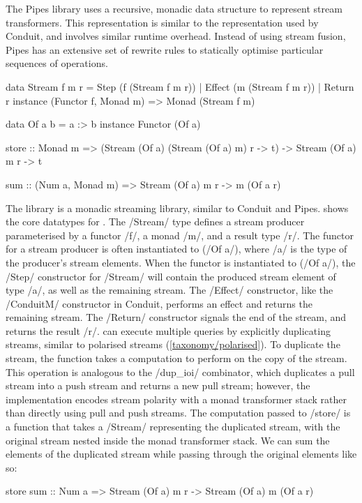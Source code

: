 The Pipes library uses a recursive, monadic data structure to represent stream transformers.
This representation is similar to the representation used by Conduit, and involves similar runtime overhead.
Instead of using stream fusion, Pipes has an extensive set of rewrite rules to statically optimise particular sequences of operations.


\begin{haskell}[float,caption=\Streaming library datatypes,label=l:bench:def:streaming]
data Stream f m r =
    Step   (f (Stream f m r))
  | Effect (m (Stream f m r))
  | Return r
instance (Functor f, Monad m) => Monad (Stream f m)

data Of a b = a :> b
instance Functor (Of a)

store :: Monad m =>
      (Stream (Of a) (Stream (Of a) m) r -> t) ->
      Stream (Of a) m r -> t

sum  :: (Num a, Monad m) =>
      Stream (Of a) m r -> m (Of a r)
\end{haskell}

The \Streaming library is a monadic streaming library, similar to Conduit and Pipes.
 shows the core datatypes for \Streaming.
The \Hs/Stream/ type defines a stream producer parameterised by a functor \Hs/f/, a monad \Hs/m/, and a result type \Hs/r/.
The functor for a stream producer is often instantiated to (\Hs/Of a/), where \Hs/a/ is the type of the producer's stream elements.
When the functor is instantiated to (\Hs/Of a/), the \Hs/Step/ constructor for \Hs/Stream/ will contain the produced stream element of type \Hs/a/, as well as the remaining stream.
The \Hs/Effect/ constructor, like the \Hs/ConduitM/ constructor in Conduit, performs an effect and returns the remaining stream.
The \Hs/Return/ constructor signals the end of the stream, and returns the result \Hs/r/.
\Streaming can execute multiple queries by explicitly duplicating streams, similar to polarised streams (\cref{taxonomy/polarised}).
To duplicate the stream, the \Hs@store@ function takes a computation to perform on the copy of the stream.
This operation is analogous to the \Hs/dup_ioi/ combinator, which duplicates a pull stream into a push stream and returns a new pull stream; however, the implementation encodes stream polarity with a monad transformer stack rather than directly using pull and push streams.
The computation passed to \Hs/store/ is a function that takes a \Hs/Stream/ representing the duplicated stream, with the original stream nested inside the monad transformer stack.
We can sum the elements of the duplicated stream while passing through the original elements like so:
\begin{haskell}
store sum :: Num a => Stream (Of a) m r -> Stream (Of a) m (Of a r)
\end{haskell}


